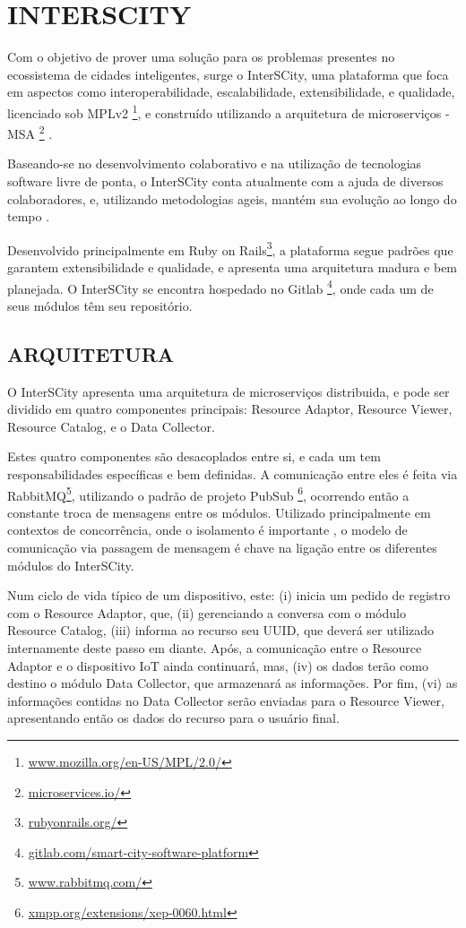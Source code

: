 \chapter[INTERSCITY]{INTERSCITY}

Com o objetivo de prover uma solução para os problemas presentes no ecossistema
de cidades inteligentes, surge o InterSCity, uma plataforma que foca em
aspectos como interoperabilidade, escalabilidade, extensibilidade, e qualidade,
licenciado sob
MPLv2 \footnote{\url{www.mozilla.org/en-US/MPL/2.0/}}, e construído
utilizando a arquitetura de microserviços -
MSA \footnote{\url{microservices.io/}} \cite{delesposte2017}.

Baseando-se no desenvolvimento colaborativo e na utilização de tecnologias
software livre de ponta, o InterSCity conta atualmente com a ajuda de diversos
colaboradores, e, utilizando metodologias ageis, mantém sua evolução ao longo
do tempo \cite{delesposte2017}.

Desenvolvido principalmente em
Ruby on Rails\footnote{\url{rubyonrails.org/}},
a plataforma segue padrões que garantem extensibilidade e qualidade, e
apresenta uma arquitetura madura e bem planejada. O InterSCity se encontra
hospedado no Gitlab \footnote{\url{gitlab.com/smart-city-software-platform}},
onde cada um de seus módulos têm seu repositório.

\section{ARQUITETURA}

O InterSCity apresenta uma arquitetura de microserviços distribuida, e pode
ser dividido em quatro componentes principais: Resource Adaptor, Resource
Viewer, Resource Catalog, e o Data Collector.

Estes quatro componentes são desacoplados entre si, e cada um tem
responsabilidades específicas e bem definidas. A comunicação entre eles é
feita via RabbitMQ\footnote{\url{www.rabbitmq.com/}}, utilizando
o padrão de projeto PubSub \footnote{\url{xmpp.org/extensions/xep-0060.html}},
ocorrendo então a constante troca de mensagens entre os módulos. Utilizado
principalmente em contextos de concorrência, onde o isolamento é
importante \cite{armstrong2003}, o modelo de comunicação via passagem de
mensagem é chave na ligação entre os diferentes módulos do InterSCity.

Num ciclo de vida típico de um dispositivo, este: (i) inicia um pedido de
registro com o Resource Adaptor, que, (ii) gerenciando a conversa com o
módulo Resource Catalog, (iii) informa ao recurso seu UUID, que deverá
ser utilizado internamente deste passo em diante. Após, a comunicação entre o
Resource Adaptor e o dispositivo IoT ainda continuará, mas, (iv) os dados terão
como destino o módulo Data Collector, que armazenará as informações. Por fim,
(vi) as informações contidas no Data Collector serão enviadas para o
Resource Viewer, apresentando então os dados do recurso para o usuário final.

